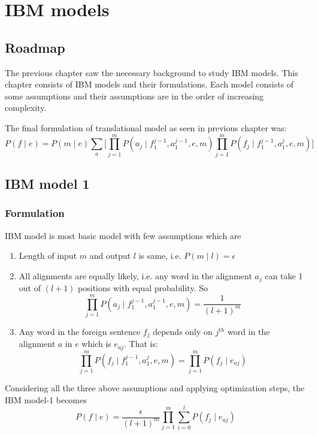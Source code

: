 \chapter{IBM models}
\section{Roadmap}
The previous chapter saw the necessary background to study IBM models. This chapter consists of IBM models and their formulations. Each model consists of some assumptions and their assumptions are in the order of increasing complexity. 

The final formulation of translational model as seen in previous chapter was:
\begin{equation}
P(f\mid e) = P(m\mid e)\sum_{a}\Bigg[ \prod_{j=1}^{m}P(a_{j}\mid f_{1}^{j-1},a_{1}^{j-1},e,m)\prod_{j=1}^{m}P(f_{j}\mid f_{1}^{j-1},a_{1}^{j},e,m)\Bigg] 
\end{equation}

\section{IBM model 1}
\subsection{Formulation}
IBM model is most basic model with few assumptions which are
\begin{enumerate}
\item Length of input $m$ and output $l$ is same, i.e. $P(m \mid l) = \epsilon$

\item All alignments are equally likely, i.e. any word in the alignment $a_{j}$ can take 1 out of $(l+1)$ positions with equal probability. So
\begin{equation*}
\prod_{j=1}^{m}P(a_{j}\mid f_{1}^{j-1},a_{1}^{j-1},e,m) =
\frac{1}{(l+1)^m} 
\end{equation*}

\item Any word in the foreign sentence $f_{j}$ depends only on $j^{th}$ word in the alignment $a$ in $e$ which is $e_{aj}$. That is:\\
\begin{equation*}
\prod_{j=1}^{m}P(f_{j}\mid f_{1}^{j-1},a_{1}^{j},e,m) = \prod_{j=1}^{m}P(f_{j}\mid e_{aj})
\end{equation*}
\end{enumerate}
Considering all the three above assumptions and applying optimization steps, the IBM model-1 becomes
\begin{equation}
P(f\mid e) = \frac{\epsilon}{(l+1)^m}\prod_{j=1}^{m}\sum_{i=0}^{l}P(f_{j}\mid e_{aj})
\end{equation}


